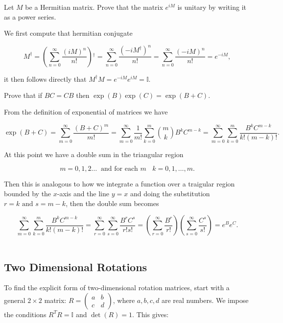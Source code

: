 \documentclass[a4paper,12pt]{report}
\begin{document}
{Let \(M\) be a Hermitian matrix. Prove that the matrix \(e^{iM} \) is unitary by writing it as a power series.}
{We first compute that hermitian conjugate 

\begin{equation}
    M^{\dagger} = \left( \sum_{n=0}^{\infty} \frac{(iM)^{n} }{n!}   \right){}^{\dagger} = \sum_{n=0}^{\infty} \frac{(-iM^{\dagger} )^{n} }{n!} = \sum_{n=0}^{\infty} \frac{(-iM)^{n} }{n!} = e^{-iM}, 
\end{equation}

it then follows directly that \(M^{\dagger} M = e^{-iM}e^{iM} = \mathbb{I}  \). 
} 

{Prove that if \(BC = CB\) then \(\exp (B)\exp (C) = \exp (B+C)\).  }
{From the definition of exponential of matrices we have 

\begin{equation}
    \exp (B+C) = \sum_{m=0}^{\infty} \frac{(B+C)^{m} }{m!} = \sum_{m=0}^{\infty} \frac{1}{m!}  \sum_{k=0}^{m} {m \choose k} B^{k} C^{m-k} = \sum_{m=0}^{\infty} \sum_{k=0}^{m} \frac{B^{k} C^{m-k} }{k! (m-k)!}.
\end{equation}

At this point we have a double sum in the triangular region 

\begin{equation}
    m = 0,1,2 \ldots ~\text { and for each \(m\) }~ k = 0,1,\ldots ,m.
\end{equation}

Then this is analogous to how we integrate a function over a traigular region bounded by the \(x\)-axis and the line \(y = x\) and doing the substitution \(r=k \text { and } s = m-k\), then the double sum becomes 

\begin{equation}
    \sum_{m=0}^{\infty} \sum_{k=0}^{m} \frac{B^{k} C^{m-k} }{k! (m-k)!} = \sum_{r=0}^{\infty} \sum_{s=0}^{\infty} \frac{B^{r} C^{s} }{r!s!} = \left( \sum_{r=0}^{\infty} \frac{B^{r} }{r!}  \right)   \left( \sum_{s=0}^{\infty} \frac{C^{s} }{s!}  \right) = e^{B}e^{C}.  
\end{equation}
~
} 



\subsection{Two Dimensional Rotations}

To find the explicit form of two-dimensional rotation matrices, start with a general \(2 \times 2\) matrix: \(R = \begin{pmatrix} a & b \\ c & d \end{pmatrix}\), where \(a, b, c, d\) are real numbers. We impose the conditions \(R^T R = \mathbb{I}\) and \(\det(R) = 1\). This gives:
\end{document}
